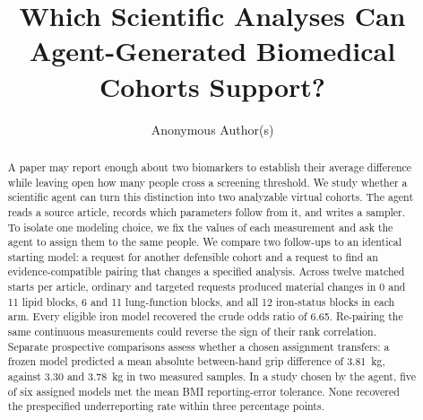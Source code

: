 \documentclass[sigconf,anonymous,review]{acmart}
\begin{document}
\title[Which Analyses Can Agent-Generated Cohorts Support?]{Which Scientific Analyses Can Agent-Gener\-ated Biomedical Cohorts Support?}
\author{Anonymous Author(s)}

\begin{abstract}
A paper may report enough about two biomarkers to establish their average difference while leaving open how many people cross a screening threshold. We study whether a scientific agent can turn this distinction into two analyzable virtual cohorts. The agent reads a source article, records which parameters follow from it, and writes a sampler. To isolate one modeling choice, we fix the values of each measurement and ask the agent to assign them to the same people. We compare two follow-ups to an identical starting model: a request for another defensible cohort and a request to find an evidence-compatible pairing that changes a specified analysis. Across twelve matched starts per article, ordinary and targeted requests produced material changes in 0 and 11 lipid blocks, 6 and 11 lung-function blocks, and all 12 iron-status blocks in each arm. Every eligible iron model recovered the crude odds ratio of 6.65. Re-pairing the same continuous measurements could reverse the sign of their rank correlation. Separate prospective comparisons assess whether a chosen assignment transfers: a frozen model predicted a mean absolute between-hand grip difference of 3.81~kg, against 3.30 and 3.78~kg in two measured samples. In a study chosen by the agent, five of six assigned models met the mean BMI reporting-error tolerance. None recovered the prespecified underreporting rate within three percentage points.

\end{abstract}

\maketitle
\end{document}
